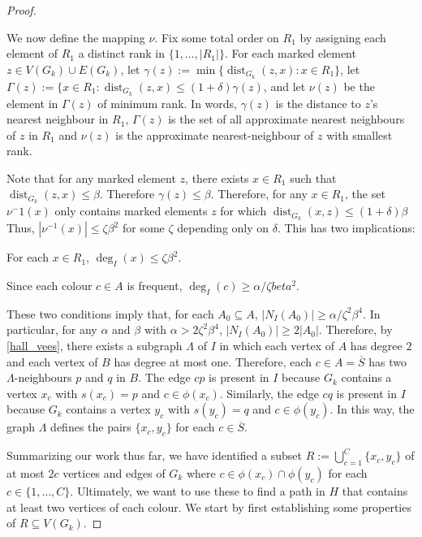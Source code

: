 \documentclass{patmorin}
\DeclareMathOperator{\dist}{dist}
\begin{document}
\begin{proof}
\begin{compactenum}[{Stage} 1:]
    We now define the mapping $\nu$.  Fix some total order on $R_1$ by assigning each element of $R_1$ a distinct rank in $\{1,\ldots,|R_1|\}$.  For each marked element $z\in V(G_k)\cup E(G_k)$, let $\gamma(z):=\min\{\dist_{G_k}(z,x):x\in R_1\}$, let $\Gamma(z):=\{x\in R_1:\dist_{G_k}(z,x) \le (1+\delta)\gamma(z)$, and let $\nu(z)$ be the element in $\Gamma(z)$ of minimum rank.  In words, $\gamma(z)$ is the distance to $z$'s nearest neighbour in $R_1$, $\Gamma(z)$ is the set of all approximate nearest neighbours of $z$ in $R_1$ and $\nu(z)$ is the approximate nearest-neighbour of $z$ with smallest rank.  
    
    Note that for any marked element $z$, there exists $x\in R_1$ such that $\dist_{G_k}(z,x)\le\beta$.  Therefore $\gamma(z)\le\beta$.  Therefore, for any $x\in R_1$, the set $\nu{^-1}(x)$ only contains marked elements $z$ for which $\dist_{G_k}(x,z)\le (1+\delta)\beta$  Thus, $|\nu^{-1}(x)|\le \zeta\beta^2$ for some $\zeta$ depending only on $\delta$. This has two implications:
    \begin{compactenum}
      \item For each $x\in R_1$,  $\deg_{I}(x) \le \zeta\beta^2$.
      \item Since each colour $c\in A$ is frequent, $\deg_I(c)\ge \alpha/\zeta beta^2$.  
    \end{compactenum}
    These two conditions imply that, for each $A_0\subseteq A$, $|N_I(A_0)|\ge \alpha/\zeta^2\beta^4$.   In particular, for any $\alpha$ and $\beta$ with $\alpha > 2\zeta^2\beta^4$,  $|N_I(A_0)|\ge 2|A_0|$.  Therefore, by \cref{hall_vees}, there exists a subgraph $\Lambda$ of $I$ in which each vertex of $A$ has degree $2$ and each vertex of $B$ has degree at most one.  Therefore, each $c\in A=\overline{S}$ has two $\Lambda$-neighbours $p$ and $q$ in $B$.  The edge $cp$ is present in $I$ because $G_k$ contains a vertex $x_c$ with $s(x_c)=p$ and $c\in \phi(x_c)$.  Similarly, the edge $cq$ is present in $I$ because $G_k$ contains a vertex $y_c$ with $s(y_c)=q$ and $c\in\phi(y_c)$.  In this way, the graph $\Lambda$ defines the pairs $\{x_c,y_c\}$ for each $c\in\overline{S}$.
  \end{compactenum}

  Summarizing our work thus far, we have identified a subset  $R:=\bigcup_{c=1}^C\{x_c,y_c\}$ of at most $2c$ vertices and edges of $G_k$ where $c\in \phi(x_c)\cap \phi(y_c)$ for each $c\in\{1,\ldots,C\}$. Ultimately, we want to use these to find a path in $H$ that contains at least two vertices of each colour.  We start by first establishing some properties of $R\subseteq V(G_k)$.


\end{proof}
\end{document}
